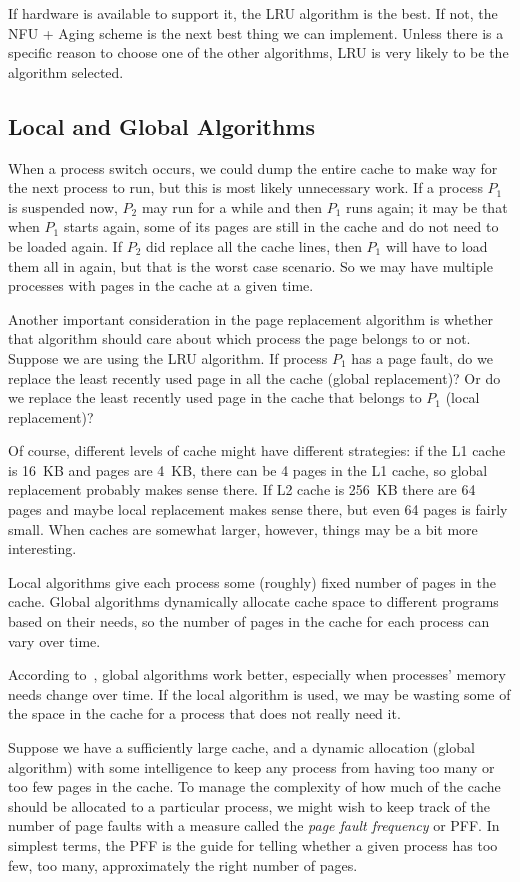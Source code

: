 If hardware is available to support it, the LRU algorithm is the best. If not, the NFU + Aging scheme is the next best thing we can implement. Unless there is a specific reason to choose one of the other algorithms, LRU is very likely to be the algorithm selected.

\subsection*{Local and Global Algorithms}
When a process switch occurs, we could dump the entire cache to make way for the next process to run, but this is most likely unnecessary work. If a process $P_{1}$ is suspended now, $P_{2}$ may run for a while and then $P_{1}$ runs again; it may be that when $P_{1}$ starts again, some of its pages are still in the cache and do not need to be loaded again. If $P_{2}$ did replace all the cache lines, then $P_{1}$ will have to load them all in again, but that is the worst case scenario. So we may have multiple processes with pages in the cache at a given time.

Another important consideration in the page replacement algorithm is whether that algorithm should care about which process the page belongs to or not. Suppose we are using the LRU algorithm. If process $P_{1}$ has a page fault, do we replace the least recently used page in all the cache (global replacement)? Or do we replace the least recently used page in the cache that belongs to $P_{1}$ (local replacement)?

Of course, different levels of cache might have different strategies: if the L1 cache is 16~KB and pages are 4~KB, there can be 4 pages in the L1 cache, so global replacement probably makes sense there. If L2 cache is 256~KB there are 64 pages and maybe local replacement makes sense there, but even 64 pages is fairly small. When caches are somewhat larger, however, things may be a bit more interesting.

Local algorithms give each process some (roughly) fixed number of pages in the cache. Global algorithms dynamically allocate cache space to different programs based on their needs, so the number of pages in the cache for each process can vary over time. 

According to~\cite{mos}, global algorithms work better, especially when processes' memory needs change over time. If the local algorithm is used, we may be wasting some of the space in the cache for a process that does not really need it. 

Suppose we have a sufficiently large cache, and a dynamic allocation (global algorithm) with some intelligence to keep any process from having too many or too few pages in the cache. To manage the complexity of how much of the cache should be allocated to a particular process, we might wish to keep track of the number of page faults with a measure called the \textit{page fault frequency} or PFF. In simplest terms, the PFF is the guide for telling whether a given process has too few, too many, approximately the right number of pages. 


